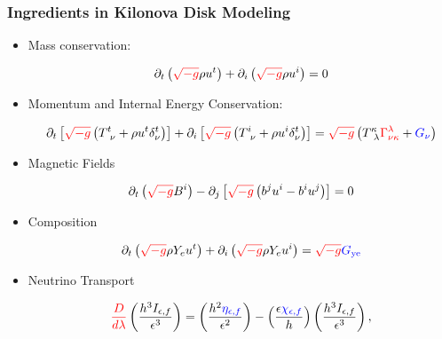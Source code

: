 \documentclass[]{beamer}
\newcommand{\paren}[1]{\left( #1 \right)}
\newcommand{\sqrbrace}[1]{\left[ #1 \right]}
\newcommand{\detg}{\sqrt{-g}}
\newcommand{\eepsilon}{\epsilon} %
\newcommand{\etanuf}{\eta_{\eepsilon,f}}
\newcommand{\Inuf}{I_{\eepsilon,f}}
\newcommand{\chinuf}{\chi_{\eepsilon,f}}
\begin{document}
\begin{frame}
  \frametitle{Ingredients in Kilonova Disk Modeling}
  \begin{itemize}
  \item Mass conservation:
    \begin{small}
      \begin{displaymath}
        \partial_t \paren{{\color{red}\detg}\rho u^t}
        + \partial_i\paren{{\color{red}\detg}\rho u^i} = 0
      \end{displaymath}
    \end{small}
  \item Momentum and Internal Energy Conservation:
    \begin{small}
      \begin{displaymath}
        \partial_t\sqrbrace{{\color{red}\detg} \paren{T^t_{\ \nu} + \rho u^t \delta^t_\nu}}
        + \partial_i\sqrbrace{{\color{red}\detg}\paren{T^i_{\ \nu} + \rho u^i \delta^t_\nu}}
        = {\color{red}\detg} \paren{T^\kappa_{\ \lambda} {\color{red}\Gamma^\lambda_{\nu\kappa}} + {\color{blue}G_\nu}}
      \end{displaymath}
    \end{small}
  \item Magnetic Fields
    \begin{small}
      \begin{displaymath}
        \partial_t \paren{{\color{red}\detg} B^i}
        - \partial_j \sqrbrace{{\color{red}\detg}\paren{b^ju^i - b^i u^j}}
        = 0
      \end{displaymath}
    \end{small}
  \item Composition
    \begin{small}
      \begin{displaymath}
        \partial_t\paren{{\color{red}\detg}\rho Y_e u^t}
        + \partial_i\paren{{\color{red}\detg}\rho Y_eu^i}
        = {\color{red}\detg} {\color{blue}G_{\text{ye}}}
      \end{displaymath}
    \end{small}
  \item Neutrino Transport
    \begin{small}
      \begin{displaymath}
        {\color{red}\frac{D}{d\lambda}}\paren{\frac{h^3\Inuf}{\eepsilon^3}}
        = \paren{\frac{h^2{\color{blue}\etanuf}}{\eepsilon^2}}
        - \paren{\frac{\eepsilon {\color{blue}\chinuf}}{h}} \paren{\frac{h^3\Inuf}{\eepsilon^3}},
      \end{displaymath}
    \end{small}
  \end{itemize}
\end{frame}
\end{document}
